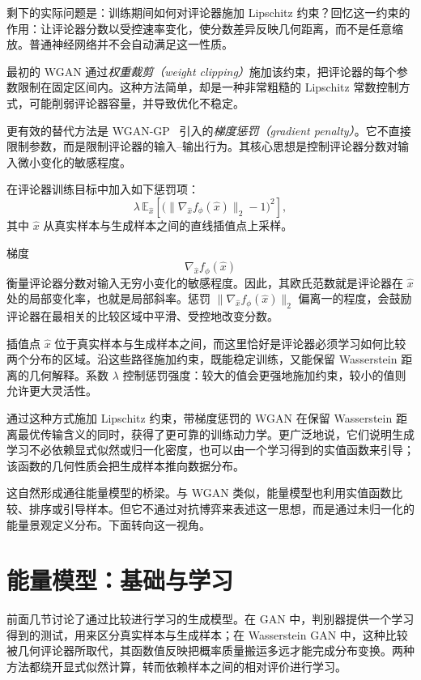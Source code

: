剩下的实际问题是：训练期间如何对评论器施加 Lipschitz 约束？回忆这一约束的作用：让评论器分数以受控速率变化，使分数差异反映几何距离，而不是任意缩放。普通神经网络并不会自动满足这一性质。

最初的 WGAN 通过\emph{权重裁剪（weight clipping）}施加该约束，把评论器的每个参数限制在固定区间内。这种方法简单，却是一种非常粗糙的 Lipschitz 常数控制方式，可能削弱评论器容量，并导致优化不稳定。

更有效的替代方法是 WGAN-GP~\cite{gulrajani2017improved} 引入的\emph{梯度惩罚（gradient penalty）}。它不直接限制参数，而是限制评论器的输入--输出行为。其核心思想是控制评论器分数对输入微小变化的敏感程度。

在评论器训练目标中加入如下惩罚项：
\[
\lambda
\,
\mathbb{E}_{\hat{x}}
\left[
\big(\|\nabla_{\hat{x}} f_\phi(\hat{x})\|_2-1\big)^2
\right],
\]
其中 $\hat{x}$ 从真实样本与生成样本之间的直线插值点上采样。

梯度
\[
\nabla_{\hat{x}} f_\phi(\hat{x})
\]
衡量评论器分数对输入无穷小变化的敏感程度。因此，其欧氏范数就是评论器在 $\hat{x}$ 处的局部变化率，也就是局部斜率。惩罚 $\|\nabla_{\hat{x}} f_\phi(\hat{x})\|_2$ 偏离一的程度，会鼓励评论器在最相关的比较区域中平滑、受控地改变分数。

插值点 $\hat{x}$ 位于真实样本与生成样本之间，而这里恰好是评论器必须学习如何比较两个分布的区域。沿这些路径施加约束，既能稳定训练，又能保留 Wasserstein 距离的几何解释。系数 $\lambda$ 控制惩罚强度：较大的值会更强地施加约束，较小的值则允许更大灵活性。

通过这种方式施加 Lipschitz 约束，带梯度惩罚的 WGAN 在保留 Wasserstein 距离最优传输含义的同时，获得了更可靠的训练动力学。更广泛地说，它们说明生成学习不必依赖显式似然或归一化密度，也可以由一个学习得到的实值函数来引导；该函数的几何性质会把生成样本推向数据分布。

这自然形成通往能量模型的桥梁。与 WGAN 类似，能量模型也利用实值函数比较、排序或引导样本。但它不通过对抗博弈来表述这一思想，而是通过未归一化的能量景观定义分布。下面转向这一视角。

\section{能量模型：基础与学习}

前面几节讨论了通过比较进行学习的生成模型。在 GAN 中，判别器提供一个学习得到的测试，用来区分真实样本与生成样本；在 Wasserstein GAN 中，这种比较被几何评论器所取代，其函数值反映把概率质量搬运多远才能完成分布变换。两种方法都绕开显式似然计算，转而依赖样本之间的相对评价进行学习。

